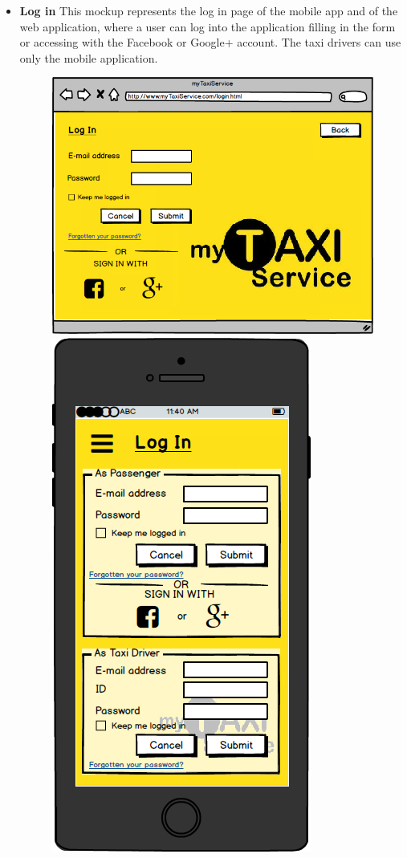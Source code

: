 \documentclass[18pt,oneside,a4paper, titlepage]{article}
\begin{document}
\begin{itemize}
\begin{figure}[h]
				\end{figure}
				\\
				\item \textbf{Log in} This mockup represents the log in page of the mobile app and of the web application, where a user can log into the application filling in the form or accessing with the Facebook or Google+ account. The taxi drivers can use only the mobile application.
				\begin{figure}[h]
					\includegraphics[scale=0.3]{Mockups/WebAppLogin.png}%
					\qquad\qquad
					\includegraphics[scale=0.3]{Mockups/MobileAppLogin.png}
					

\end{figure}
\end{itemize}
\end{document}
